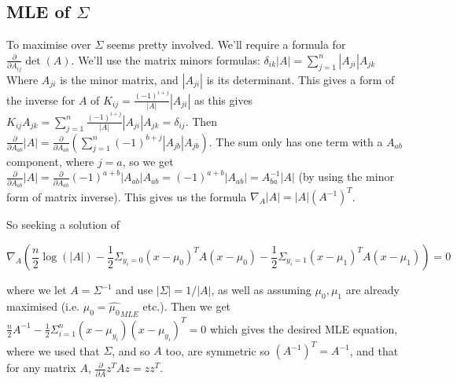 \begin{answer}
\subsection*{MLE of $\Sigma$}
To maximise over $\Sigma$ seems pretty involved. We'll require a formula for $\frac{\partial}{\partial A_{ij}} \det(A)$. We'll use the matrix minors formulas: $\delta_{ik} |A| = \sum_{j=1}^n |A_{ji}| A_{jk}$ Where $A_{ji}$ is the minor matrix, and $|A_{ji}|$ is its determinant. This gives a form of the inverse for $A$ of $K_{ij} = \frac{(-1)^{i+j}}{|A|} |A_{ji}|$ as this gives $K_{ij} A_{jk} = \sum_{j=1}^n \frac{(-1)^{i+j}}{|A|} |A_{ji}| A_{jk} = \delta_{ij}$. Then $\frac{\partial}{\partial A_{ab}} |A| = \frac{\partial}{\partial A_{ab}} \left( \sum_{j=1}^n (-1)^{b+j} |A_{jb}| A_{jb} \right)$. The sum only has one term with a $A_{ab}$ component, where $j=a$, so we get $\frac{\partial}{\partial A_{ab}} |A| = \frac{\partial}{\partial A_{ab}} (-1)^{a+b} |A_{ab}| A_{ab} = (-1)^{a+b} |A_{ab}| = A^{-1}_{ba} |A|$ (by using the minor form of matrix inverse). This gives us the formula $\nabla_A |A| = |A| (A^{-1})^T$.

So seeking a solution of

\begin{equation*}
\nabla_A \left(
	\frac{n}{2}\log(|A|) -\frac{1}{2} \Sigma_{y_i = 0} (x - \mu_0)^T A (x - \mu_0) -\frac{1}{2} \Sigma_{y_i = 1} (x - \mu_1)^T A (x - \mu_1)
\right) = 0
\end{equation*} 

where we let $A = \Sigma^{-1}$ and use $|\Sigma| = 1/|A|$, as well as assuming $\mu_0, \mu_1$ are already maximised (i.e. $\mu_0 = \hat{\mu_0}_{MLE}$ etc.). Then we get $\frac{n}{2} A^{-1} - \frac{1}{2} \Sigma_{i=1}^n (x - \mu_{y_i})(x - \mu_{y_i})^T = 0$ which gives the desired MLE equation, where we used that $\Sigma$, and so $A$ too, are symmetric so $(A^{-1})^T = A^{-1}$, and that for any matrix $A$, $\frac{\partial}{\partial A} z^T A z = z z^T$.

\end{answer}
%